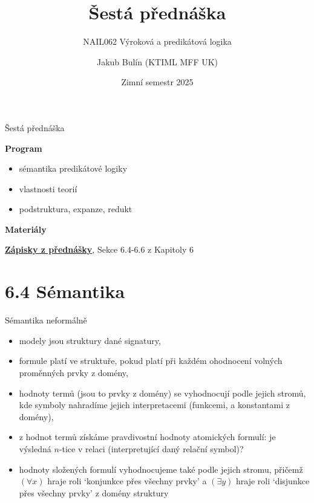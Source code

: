 \documentclass{beamer}
\title{Šestá přednáška}
\subtitle{NAIL062 Výroková a predikátová logika}
\author{Jakub Bulín (KTIML MFF UK)}
\date{Zimní semestr 2025}
\begin{document}
\maketitle


\begin{frame}{Šestá přednáška}

    \textbf{Program}
        \begin{itemize}
            \item sémantika predikátové logiky 
            \item vlastnosti teorií
            \item podstruktura, expanze, redukt
            
        \end{itemize}

    \textbf{Materiály}

        \href{https://github.com/jbulin-mff-uk/nail062/raw/main/lecture/lecture-notes/lecture-notes.pdf}{\alert{\textbf{Zápisky z přednášky}}}, Sekce 6.4-6.6 z Kapitoly 6

\end{frame}


\section{6.4 Sémantika}


\begin{frame}{Sémantika neformálně}

    \begin{itemize}[<+->]
        \item \alert{modely jsou struktury} dané signatury,
        \item formule \alert{platí} ve struktuře, pokud platí při každém ohodnocení volných proměnných prvky z domény,
        \item \alert{hodnoty termů} (jsou to prvky z domény) se vyhodnocují podle jejich stromů, kde symboly nahradíme jejich interpretacemi (funkcemi, a konstantami z domény),
        \item z hodnot termů získáme \alert{pravdivostní hodnoty atomických formulí}: je výsledná $n$-tice v relaci (interpretující daný relační symbol)?
        \item hodnoty složených formulí vyhodnocujeme také podle jejich stromu, přičemž \alert{$(\forall x)$ hraje roli `konjunkce přes všechny prvky'} a  \alert{$(\exists y)$ hraje roli `disjunkce přes všechny prvky'} z domény struktury
    \end{itemize}

\end{frame}
\end{document}
